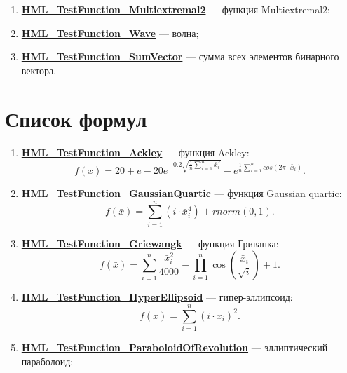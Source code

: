 \begin{enumerate}
 \item \hyperref[TestFunctions:section:HML_TestFunction_Multiextremal2]{\textbf{HML\_TestFunction\_Multiextremal2}} --- функция Multiextremal2;
 \item \hyperref[TestFunctions:section:HML_TestFunction_Wave]{\textbf{HML\_TestFunction\_Wave}} --- волна;
 \item \hyperref[TestFunctions:section:HML_TestFunction_SumVector]{\textbf{HML\_TestFunction\_SumVector}} --- сумма всех элементов бинарного вектора.
\end{enumerate}

\section {Список формул}

\begin{enumerate}
 \item \hyperref[TestFunctions:section:HML_TestFunction_Ackley]{\textbf{HML\_TestFunction\_Ackley}} --- функция Ackley:
 \begin{equation}
 f\left( \bar{x}\right) = 20 + e - 20e^{-0.2\sqrt{\frac{1}{n}\sum_{i=1}^{n}\bar{x}_i^2}}-e^{\frac{1}{n}\sum_{i=1}^{n}cos\left( 2\pi\cdot\bar{x}_i\right) }.
 \end{equation}
 \item \hyperref[TestFunctions:section:HML_TestFunction_GaussianQuartic]{\textbf{HML\_TestFunction\_GaussianQuartic}} --- функция Gaussian quartic:
 \begin{equation}
 f\left( \bar{x}\right) = \sum_{i=1}^{n}\left( i\cdot\bar{x}_i^4\right) +rnorm\left( 0,1\right).
 \end{equation}
 \item \hyperref[TestFunctions:section:HML_TestFunction_Griewangk]{\textbf{HML\_TestFunction\_Griewangk}} --- функция Гриванка:
\begin{equation}
f\left( \bar{x}\right) = \sum_{i=1}^{n}\dfrac{\bar{x}_i^2}{4000}-\prod_{i=1}^{n}\cos\left( \dfrac{\bar{x}_i}{\sqrt{i}}\right)+1.
\end{equation} \item \hyperref[TestFunctions:section:HML_TestFunction_HyperEllipsoid]{\textbf{HML\_TestFunction\_HyperEllipsoid}} --- гипер-эллипсоид:
\begin{equation}
f\left( \bar{x}\right) = \sum_{i=1}^{n}\left( i\cdot\bar{x}_i\right) ^2.
\end{equation}
 \item \hyperref[TestFunctions:section:HML_TestFunction_ParaboloidOfRevolution]{\textbf{HML\_TestFunction\_ParaboloidOfRevolution}} --- эллиптический параболоид:

\end{enumerate}
